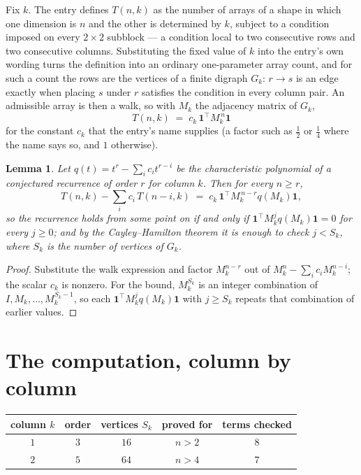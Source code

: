 \documentclass[11pt,a4paper]{article}
\theoremstyle{plain}
\newtheorem{lemma}[theorem]{Lemma}
\theoremstyle{definition}
\begin{document}
Fix $k$. The entry defines $T(n,k)$ as the number of arrays of a shape in which one dimension
is $n$ and the other is determined by $k$, subject to a condition imposed on every
$2\times2$ subblock --- a condition local to two consecutive rows and two consecutive columns.
Substituting the fixed value of $k$ into the entry's own wording turns the definition into an
ordinary one-parameter array count, and for such a count the rows are the vertices of a finite
digraph $G_k$: $r\to s$ is an edge exactly when placing $s$ under $r$ satisfies the condition
in every column pair. An admissible array is then a walk, so with $M_k$ the adjacency matrix
of $G_k$,
\[
T(n,k)\;=\;c_k\,\mathbf{1}^{\!\top}M_k^{\,n}\mathbf{1}
\]
for the constant $c_k$ that the entry's name supplies (a factor such as $\tfrac12$ or
$\tfrac14$ where the name says so, and $1$ otherwise).

\begin{lemma}\label{lem:crit}
Let $q(t)=t^{r}-\sum_i c_it^{r-i}$ be the characteristic polynomial of a conjectured
recurrence of order $r$ for column $k$. Then for every $n\ge r$,
\[
T(n,k)-\sum_i c_i\,T(n-i,k)\;=\;c_k\,\mathbf{1}^{\!\top}M_k^{\,n-r}q(M_k)\mathbf{1},
\]
so the recurrence holds from some point on if and only if
$\mathbf{1}^{\!\top}M_k^{j}q(M_k)\mathbf{1}=0$ for every $j\ge0$; and by the
Cayley--Hamilton theorem it is enough to check $j<S_k$, where $S_k$ is the number of vertices
of $G_k$.
\end{lemma}

\begin{proof}
Substitute the walk expression and factor $M_k^{n-r}$ out of $M_k^{n}-\sum_ic_iM_k^{n-i}$;
the scalar $c_k$ is nonzero. For the bound, $M_k^{S_k}$ is an integer combination of
$I,M_k,\dots,M_k^{S_k-1}$, so each $\mathbf{1}^{\!\top}M_k^{j}q(M_k)\mathbf{1}$ with
$j\ge S_k$ repeats that combination of earlier values.
\end{proof}

\section{The computation, column by column}

\begin{center}
\begin{tabular}{ccccc}
column $k$ & order & vertices $S_k$ & proved for & terms checked \\ \hline
$1$ & $3$ & $16$ & $n>2$ & $8$ \\
$2$ & $5$ & $64$ & $n>4$ & $7$ \\
\end{tabular}
\end{center}
\end{document}
